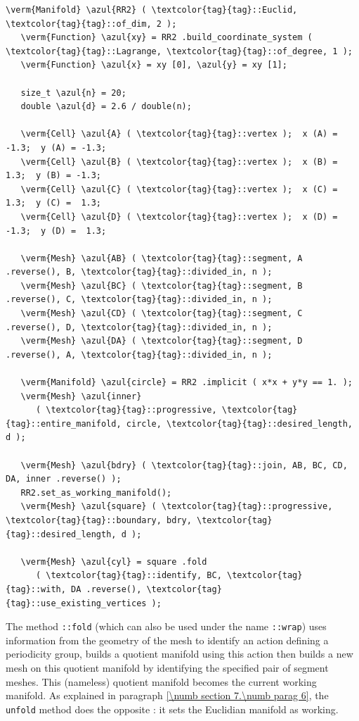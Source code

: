 \begin{Verbatim}[commandchars=\\\{\},formatcom=\small\tt,frame=single,
   label=parag-\ref{\numb section 7.\numb parag 16}.cpp,rulecolor=\color{coment},
   baselinestretch=0.94,framesep=2mm                                             ]
   \verm{Manifold} \azul{RR2} ( \textcolor{tag}{tag}::Euclid, \textcolor{tag}{tag}::of_dim, 2 );
   \verm{Function} \azul{xy} = RR2 .build_coordinate_system ( \textcolor{tag}{tag}::Lagrange, \textcolor{tag}{tag}::of_degree, 1 );
   \verm{Function} \azul{x} = xy [0], \azul{y} = xy [1];

   size_t \azul{n} = 20;
   double \azul{d} = 2.6 / double(n);

   \verm{Cell} \azul{A} ( \textcolor{tag}{tag}::vertex );  x (A) = -1.3;  y (A) = -1.3;
   \verm{Cell} \azul{B} ( \textcolor{tag}{tag}::vertex );  x (B) =  1.3;  y (B) = -1.3;
   \verm{Cell} \azul{C} ( \textcolor{tag}{tag}::vertex );  x (C) =  1.3;  y (C) =  1.3;
   \verm{Cell} \azul{D} ( \textcolor{tag}{tag}::vertex );  x (D) = -1.3;  y (D) =  1.3;

   \verm{Mesh} \azul{AB} ( \textcolor{tag}{tag}::segment, A .reverse(), B, \textcolor{tag}{tag}::divided_in, n );
   \verm{Mesh} \azul{BC} ( \textcolor{tag}{tag}::segment, B .reverse(), C, \textcolor{tag}{tag}::divided_in, n );
   \verm{Mesh} \azul{CD} ( \textcolor{tag}{tag}::segment, C .reverse(), D, \textcolor{tag}{tag}::divided_in, n );
   \verm{Mesh} \azul{DA} ( \textcolor{tag}{tag}::segment, D .reverse(), A, \textcolor{tag}{tag}::divided_in, n );

   \verm{Manifold} \azul{circle} = RR2 .implicit ( x*x + y*y == 1. );
   \verm{Mesh} \azul{inner}
      ( \textcolor{tag}{tag}::progressive, \textcolor{tag}{tag}::entire_manifold, circle, \textcolor{tag}{tag}::desired_length, d );

   \verm{Mesh} \azul{bdry} ( \textcolor{tag}{tag}::join, AB, BC, CD, DA, inner .reverse() );
   RR2.set_as_working_manifold();
   \verm{Mesh} \azul{square} ( \textcolor{tag}{tag}::progressive, \textcolor{tag}{tag}::boundary, bdry, \textcolor{tag}{tag}::desired_length, d );

   \verm{Mesh} \azul{cyl} = square .fold
      ( \textcolor{tag}{tag}::identify, BC, \textcolor{tag}{tag}::with, DA .reverse(), \textcolor{tag}{tag}::use_existing_vertices );
\end{Verbatim}

The method {\small\tt{}::fold} (which can also be used under the name
{\small\tt{}::wrap}) uses information from the geometry of the mesh
to identify an action defining a periodicity group,
builds a quotient manifold using this action then builds a new mesh on this quotient manifold
by identifying the specified pair of segment meshes.
This (nameless) quotient manifold becomes the current working manifold.
As explained in paragraph \ref{\numb section 7.\numb parag 6}, the {\small\tt unfold} method
does the opposite : it sets the Euclidian manifold as working.

